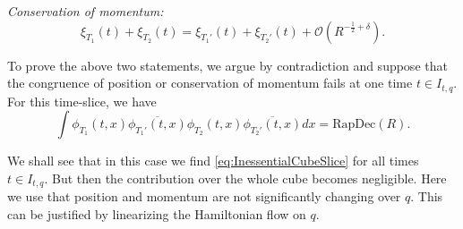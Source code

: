\documentclass{amsart}
\theoremstyle{definition}
\begin{document}
\smallskip

\emph{Conservation of momentum:}
\begin{equation}
\label{eq:MomentumConservation}
\xi_{T_1}(t) + \xi_{T_2}(t) = \xi_{T_1'}(t) + \xi_{T_2'}(t) + \mathcal{O}(R^{-\frac{1}{2}+\delta}).
\end{equation}

To prove the above two statements, we argue by contradiction and suppose that the congruence of position or conservation of momentum fails at one time $t \in I_{t,q}$. For this time-slice, we have
\begin{equation}
\label{eq:InessentialCubeSlice}
\int \phi_{T_1}(t,x) \overline{\phi_{T_1'}(t,x)} \phi_{T_2}(t,x) \overline{\phi_{T_2'}(t,x)} dx = \text{RapDec}(R).
\end{equation}

 We shall see that in this case we find \eqref{eq:InessentialCubeSlice} for all times $t \in I_{t,q}$. But then the contribution over the whole cube becomes negligible. Here we use that position and momentum are not significantly changing over $q$. This can be justified by linearizing the Hamiltonian flow on $q$.
\end{document}
